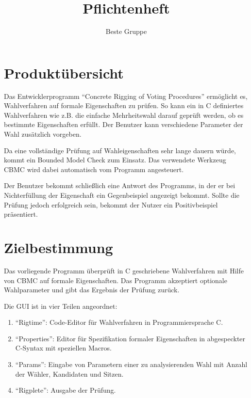 \documentclass[a4paper]{scrreprt}
\begin{document}
 
\title{Pflichtenheft}
\author{Beste Gruppe}
\maketitle
 

\tableofcontents
 
\chapter{Produktübersicht}
Das Entwicklerprogramm "`Concrete Rigging of Voting Procedures"' ermöglicht es, Wahlverfahren auf formale Eigenschaften zu prüfen. So kann ein in C definiertes Wahlverfahren wie z.B. die einfache Mehrheitswahl darauf geprüft werden, ob es bestimmte Eigenschaften erfüllt. Der Benutzer kann verschiedene Parameter der Wahl zusätzlich vorgeben.


Da eine vollständige Prüfung auf Wahleigenschaften sehr lange dauern würde, kommt ein Bounded Model Check zum Einsatz. Das verwendete Werkzeug CBMC wird dabei automatisch vom Programm angesteuert.

Der Benutzer bekommt schließlich eine Antwort des Programms, in der er bei Nichterfüllung der Eigenschaft ein Gegenbeispiel angezeigt bekommt. Sollte die Prüfung jedoch erfolgreich sein, bekommt der Nutzer ein Positivbeispiel präsentiert.


\chapter{Zielbestimmung}
Das vorliegende Programm überprüft in C geschriebene Wahlverfahren mit Hilfe von CBMC auf formale Eigenschaften. Das Programm akzeptiert optionale Wahlparameter und gibt das Ergebnis der Prüfung zurück.

Die GUI ist in vier Teilen angeordnet:
\begin{enumerate}
\item "`Rigtime"': Code-Editor für Wahlverfahren in Programmiersprache C.
\item "`Properties"': Editor für Spezifikation formaler Eigenschaften in abgespeckter C-Syntax mit speziellen Macros.
\item "`Params"': Eingabe von Parametern einer zu analysierenden Wahl mit Anzahl der Wähler, Kandidaten und Sitzen.
\item "`Rigplete"': Ausgabe der Prüfung.
\end{enumerate}
\end{document}
